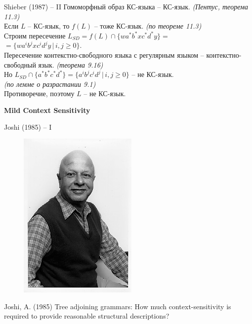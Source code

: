 \documentclass{beamer}
\begin{document}
\begin{frame}{Shieber (1987) -- II}
Гомоморфный образ КС-языка -- КС-язык. {\small \textit{(Пентус, теорема 11.3)}}\\
\bigskip
Если $L$ -- КС-язык, то $f(L)$ -- тоже КС-язык. {\small \textit{(по теореме 11.3)}}\\
\bigskip
Строим пересечение $L_{SD} = f(L) \cap \{ wa^*b^*xc^*d^*y \} =$\\ $= \{ wa^ib^jxc^id^jy \, | \, i, j \geq 0 \}$.\\
\bigskip
Пересечение контекстно-свободного языка с регулярным языком -- контекстно-свободный язык. {\small \textit{(теорема 9.16)}}\\
\bigskip
Но $L_{SD} \cap \{ a^*b^*c^*d^* \} = \{ a^ib^jc^id^j \, | \, i, j \geq 0 \}$ -- не КС-язык.\\ {\small \textit{(по лемме о разрастании 9.1)}}\\
\bigskip
Противоречие, поэтому $L$ -- не КС-язык.
\end{frame}


\begin{frame}{}
\begin{center}
	\textbf{Mild Context Sensitivity}
\end{center}
\end{frame}

\begin{frame}{Joshi (1985) -- I}
\begin{center}
	\begin{figure}[H]
		\includegraphics[scale=0.5]{joshi.jpg} 
	\end{figure}
\end{center}
\smallskip
\begin{center}
{\small Joshi, A. (1985) Tree adjoining grammars: How much context-sensitivity is required to provide reasonable structural descriptions?}
\end{center}
\end{frame}
\end{document}

